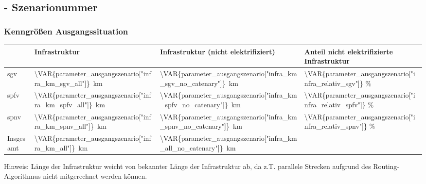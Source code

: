 \subsection{ - Szenarionummer }\label{chap_kenngrößen_s_\VAR{scenario_id}}

\subsubsection{Kenngrößen Ausgangssituation}
\begin{center}
	\begin{tabularx}{\textwidth}{l | X | X | X} & Infrastruktur & Infrastruktur (nicht elektrifiziert) & Anteil nicht elektrifizierte Infrastruktur \\
	\hline
	\acrshort{sgv} & \SI{\VAR{parameter_ausgangszenario["infra_km_sgv_all"]}}{\km} & \SI{\VAR{parameter_ausgangszenario["infra_km_sgv_no_catenary"]}}{\km} & \num{\VAR{parameter_ausgangszenario["infra_relativ_sgv"]}} \% \\
	\acrshort{spfv} & \SI{\VAR{parameter_ausgangszenario["infra_km_spfv_all"]}}{\km} & \SI{\VAR{parameter_ausgangszenario["infra_km_spfv_no_catenary"]}}{\km} & \num{\VAR{parameter_ausgangszenario["infra_relativ_spfv"]}} \% \\
	\acrshort{spnv} & \SI{\VAR{parameter_ausgangszenario["infra_km_spnv_all"]}}{\km} & \SI{\VAR{parameter_ausgangszenario["infra_km_spnv_no_catenary"]}}{\km} & \num{\VAR{parameter_ausgangszenario["infra_relativ_spnv"]}} \% \\
	\hline
	Insgesamt & \SI{\VAR{parameter_ausgangszenario["infra_km_all"]}}{\km} & \SI{\VAR{parameter_ausgangszenario["infra_km_all_no_catenary"]}}{\km} & \\
	\end{tabularx}
\end{center}
\hspace{2em}

Hinweis: Länge der Infrastruktur weicht von bekannter Länge der Infrastruktur ab, da z.T. parallele Strecken aufgrund des Routing-Algorithmus nicht mitgerechnet werden können.


